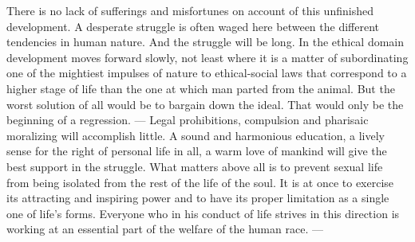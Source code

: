 \documentclass[12pt,a4paper,openany]{book}
\newcommand{\opage}[1]{\marginnote{\footnotesize\textit{[#1]}}}
\begin{document}
There is no lack of sufferings and misfortunes on account of this unfinished development. A desperate struggle is often
waged here
\opage{298}between the different tendencies in human nature. And the struggle will be long. In the ethical domain
development moves forward slowly, not least where it is a matter of subordinating one of the mightiest impulses of
nature to ethical-social laws that correspond to a higher stage of life than the one at which man parted from the
animal. But the worst solution of all would be to bargain down the ideal. That would only be the beginning of a
regression. --- Legal prohibitions, compulsion and pharisaic moralizing will accomplish little. A sound and harmonious
education, a lively sense for the right of personal life in all, a warm love of mankind will give the best support in
the struggle. What matters above all is to prevent sexual life from being isolated from the rest of the life of the
soul. It is at once to exercise its attracting and inspiring power and to have its proper limitation as a single one of
life's forms. Everyone who in his conduct of life strives in this direction is working at an essential part of the
welfare of the human race. ---
\end{document}
